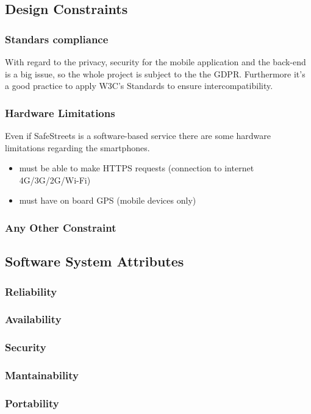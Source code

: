 \documentclass{article}
\begin{document}
\subsection{Design Constraints}
\subsubsection{Standars compliance}
With regard to the privacy, security for the mobile application and the back-end
is a big issue, so the whole project is subject to the the GDPR. Furthermore
it's a good practice to apply W3C's Standards to ensure intercompatibility.
\subsubsection{Hardware Limitations}
Even if SafeStreets is a software-based service there are some hardware
limitations regarding the smartphones.
\begin{itemize}
    \item must be able to make HTTPS requests (connection to internet
    4G/3G/2G/Wi-Fi)
    \item must have on board GPS (mobile devices only)
\end{itemize}
\subsubsection{Any Other Constraint}
\subsection{Software System Attributes}
\subsubsection{Reliability}
\subsubsection{Availability}
\subsubsection{Security}
\subsubsection{Mantainability}
\subsubsection{Portability}
\end{document}
